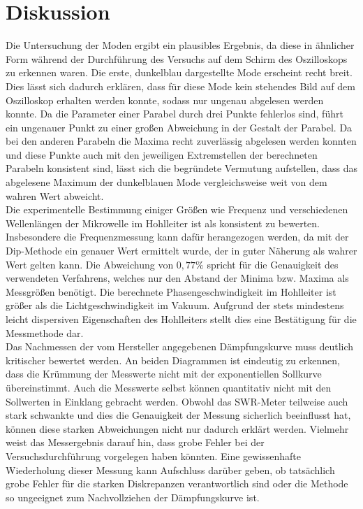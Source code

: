\section{Diskussion}
\label{sec:Diskussion}
Die Untersuchung der Moden ergibt ein plausibles Ergebnis, da diese in ähnlicher Form während der Durchführung des Versuchs auf dem Schirm des Oszilloskops zu erkennen waren. Die erste, dunkelblau dargestellte Mode erscheint recht breit. Dies lässt sich dadurch erklären, dass für diese Mode kein stehendes Bild auf dem Oszilloskop erhalten werden konnte, sodass nur ungenau abgelesen werden konnte. Da die Parameter einer Parabel durch drei Punkte fehlerlos sind, führt ein ungenauer Punkt zu einer großen Abweichung in der Gestalt der Parabel. Da bei den anderen Parabeln die Maxima recht zuverlässig abgelesen werden konnten und diese Punkte auch mit den jeweiligen Extremstellen der berechneten Parabeln konsistent sind, lässt sich die begründete Vermutung aufstellen, dass das abgelesene Maximum der dunkelblauen Mode vergleichsweise weit von dem wahren Wert abweicht.\\
Die experimentelle Bestimmung einiger Größen wie Frequenz und verschiedenen Wellenlängen der Mikrowelle im Hohlleiter ist als konsistent zu bewerten. Insbesondere die Frequenzmessung kann dafür herangezogen werden, da mit der Dip-Methode ein genauer Wert ermittelt wurde, der in guter Näherung als wahrer Wert gelten kann. Die Abweichung von $0{,}77\%$ spricht für die Genauigkeit des verwendeten Verfahrens, welches nur den Abstand der Minima bzw. Maxima als Messgrößen benötigt. Die berechnete Phasengeschwindigkeit im Hohlleiter ist größer als die Lichtgeschwindigkeit im Vakuum. Aufgrund der stets mindestens leicht dispersiven Eigenschaften des Hohlleiters stellt dies eine Bestätigung für die Messmethode dar.\\
Das Nachmessen der vom Hersteller angegebenen Dämpfungskurve muss deutlich kritischer bewertet werden. An beiden Diagrammen ist eindeutig zu erkennen, dass die Krümmung der Messwerte nicht mit der exponentiellen Sollkurve übereinstimmt. Auch die Messwerte selbst können quantitativ nicht mit den Sollwerten in Einklang gebracht werden. Obwohl das SWR-Meter teilweise auch stark schwankte und dies die Genauigkeit der Messung sicherlich beeinflusst hat, können diese starken Abweichungen nicht nur dadurch erklärt werden. Vielmehr weist das Messergebnis darauf hin, dass grobe Fehler bei der Versuchsdurchführung vorgelegen haben könnten. Eine gewissenhafte Wiederholung dieser Messung kann Aufschluss darüber geben, ob tatsächlich grobe Fehler für die starken Diskrepanzen verantwortlich sind oder die Methode so ungeeignet zum Nachvollziehen der Dämpfungskurve ist.\\

